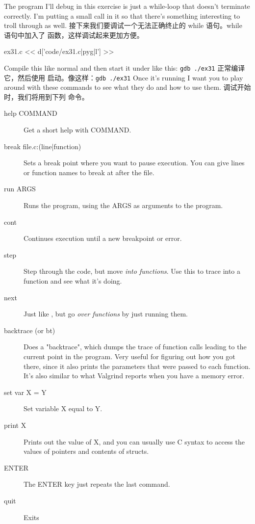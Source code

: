 \begin{enumerate}
The program I'll debug in this exercise is just a while-loop that doesn't
terminate correctly.  I'm putting a small  call in it so that
there's something interesting to troll through as well.
接下来我们要调试一个无法正确终止的 while 语句。while 语句中加入了
 函数，这样调试起来更加方便。

\begin{code}{ex31.c}
<< d['code/ex31.c|pyg|l'] >>
\end{code}

Compile this like normal and then start it under  like this:  \verb|gdb ./ex31|
正常编译它，然后使用  启动。像这样：\verb|gdb ./ex31|
Once it's running I want you to play around with these  commands
to see what they do and how to use them.
调试开始时，我们将用到下列  命令。

\begin{description}
\item[help COMMAND] Get a short help with COMMAND.
\item[break file.c:(line|function)] Sets a break point where you want to pause execution.  You can give lines or function names to break at after the file.
\item[run ARGS] Runs the program, using the ARGS as arguments to the program.
\item[cont] Continues execution until a new breakpoint or error.
\item[step] Step through the code, but move \emph{into functions}.  Use this to 
    trace into a function and see what it's doing.
\item[next] Just like , but go \emph{over functions} by just running them.
\item[backtrace (or bt)] Does a "backtrace", which dumps the trace of function
    calls leading to the current point in the program. Very useful for figuring
    out how you got there, since it also prints the parameters that were passed
    to each function.  It's also similar to what Valgrind reports when you have
    a memory error.
\item[set var X = Y] Set variable X equal to Y.
\item[print X] Prints out the value of X, and you can usually use C syntax to access
    the values of pointers and contents of structs.
\item[ENTER] The ENTER key just repeats the last command.
\item[quit] Exits 
\end{description}


\end{enumerate}
